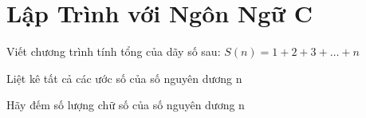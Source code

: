 
\chapter{Lập Trình với Ngôn Ngữ C}
\hypertarget{localtoc\thechapter}{}
\localtoc

\begin{problem}
    Viết chương trình tính tổng của dãy số sau: $S(n) = 1 + 2 + 3 + … + n$
\end{problem}

\begin{problem}
    Liệt kê tất cả các ước số của số nguyên dương n
\end{problem}

\begin{problem}
    Hãy đếm số lượng chữ số của số nguyên dương n
\end{problem}


